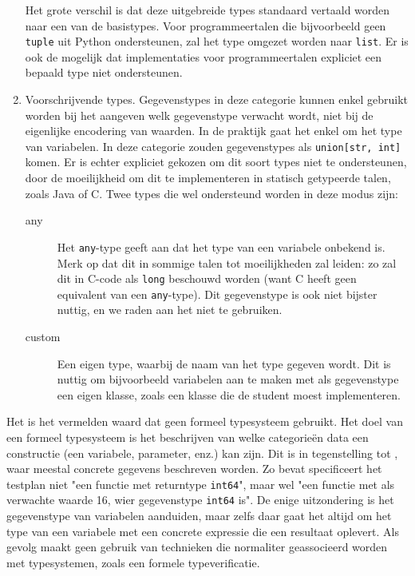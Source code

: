 \begin{enumerate}
    Het grote verschil is dat deze uitgebreide types standaard vertaald worden naar een van de basistypes.
    Voor programmeertalen die bijvoorbeeld geen \texttt{tuple} uit Python ondersteunen, zal het type omgezet worden naar \texttt{list}.
    Er is ook de mogelijk dat implementaties voor programmeertalen expliciet een bepaald type niet ondersteunen.
    \item Voorschrijvende types.
    Gegevenstypes in deze categorie kunnen enkel gebruikt worden bij het aangeven welk gegevenstype verwacht wordt, niet bij de eigenlijke encodering van waarden.
    In de praktijk gaat het enkel om het type van variabelen.
    In deze categorie zouden gegevenstypes als \texttt{union[str, int]} komen.
    Er is echter expliciet gekozen om dit soort types niet te ondersteunen, door de moeilijkheid om dit te implementeren in statisch getypeerde talen, zoals Java of C\@.
    Twee types die wel ondersteund worden in deze modus zijn:
    \begin{description}
        \item[any] Het \texttt{any}-type geeft aan dat het type van een variabele onbekend is.
        Merk op dat dit in sommige talen tot moeilijkheden zal leiden: zo zal dit in C-code als \texttt{long} beschouwd worden (want C heeft geen equivalent van een \texttt{any}-type).
        Dit gegevenstype is ook niet bijster nuttig, en we raden aan het niet te gebruiken.
        \item[custom] Een eigen type, waarbij de naam van het type gegeven wordt.
        Dit is nuttig om bijvoorbeeld variabelen aan te maken met als gegevenstype een eigen klasse, zoals een klasse die de student moest implementeren.
    \end{description}
\end{enumerate}

Het is het vermelden waard dat \tested{} geen formeel typesysteem gebruikt.
Het doel van een formeel typesysteem is het beschrijven van welke categorieën data een constructie (een variabele, parameter, enz.) kan zijn.
Dit is in tegenstelling tot \tested{}, waar meestal concrete gegevens beschreven worden.
Zo bevat specificeert het testplan niet "een functie met returntype \texttt{int64}", maar wel "een functie met als verwachte waarde 16, wier gegevenstype \texttt{int64} is".
De enige uitzondering is het gegevenstype van variabelen aanduiden, maar zelfs daar gaat het altijd om het type van een variabele met een concrete expressie die een resultaat oplevert.
Als gevolg maakt \tested{} geen gebruik van technieken die normaliter geassocieerd worden met typesystemen, zoals een formele typeverificatie.

